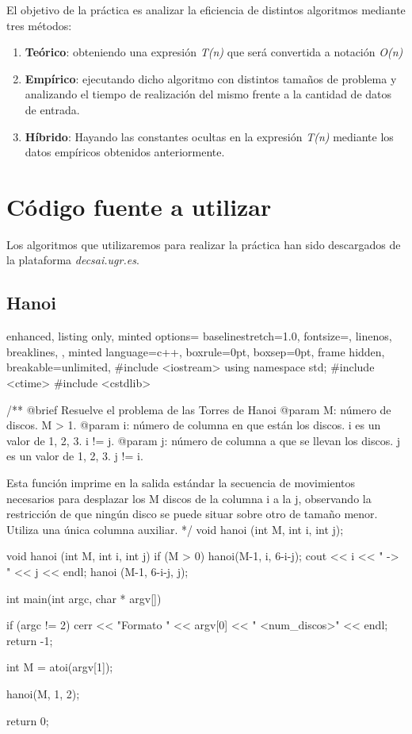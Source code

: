 \documentclass[12pt,spanish]{article}
\begin{document}
El objetivo de la práctica es analizar la eficiencia de distintos algoritmos mediante tres métodos:
\begin{enumerate}
\item \textbf{Teórico}: obteniendo una expresión \textit{T(n)} que será convertida a notación \textit{O(n)}
\item \textbf{Empírico}: ejecutando dicho algoritmo con distintos tamaños de problema y analizando el tiempo de realización del mismo frente a la cantidad de datos de entrada.
\item \textbf{Híbrido}: Hayando las constantes ocultas en la expresión \textit{T(n)} mediante los datos empíricos obtenidos anteriormente.
\end{enumerate}
\section{Código fuente a utilizar}

Los algoritmos que utilizaremos para realizar la práctica han sido descargados de la plataforma \textit{decsai.ugr.es}.

\subsection{Hanoi}
\begin{multicols}{2}
\begin{tcblisting}{
  enhanced,
  listing only,
  minted options={
    baselinestretch=1.0,
    fontsize=\footnotesize,
    linenos,
    breaklines,
  },
  minted language=c++,
  boxrule=0pt,
  boxsep=0pt,
  frame hidden,
  breakable=unlimited,
}  
#include <iostream>
using namespace std;
#include <ctime>
#include <cstdlib>

/**
   @brief Resuelve el problema de las Torres de Hanoi
   @param M: número de discos. M > 1.
   @param i: número de columna en que están los discos.
             i es un valor de {1, 2, 3}. i != j.
   @param j: número de columna a que se llevan los discos.
             j es un valor de {1, 2, 3}. j != i.

   Esta función imprime en la salida estándar la secuencia de 
   movimientos necesarios para desplazar los M discos de la
   columna i a la j, observando la restricción de que ningún
   disco se puede situar sobre otro de tamaño menor. Utiliza
   una única columna auxiliar.
*/
void hanoi (int M, int i, int j);

void hanoi (int M, int i, int j)
{
  if (M > 0)
    {
      hanoi(M-1, i, 6-i-j);
      cout << i << " -> " << j << endl;
      hanoi (M-1, 6-i-j, j);
  }
}

int main(int argc, char * argv[])
{
  
    if (argc != 2)
    {
      cerr << "Formato " << argv[0] << " <num_discos>" << endl;
      return -1;
    }

  int M = atoi(argv[1]);

  hanoi(M, 1, 2);

  return 0;
}
\end{tcblisting}
\end{multicols}
\newpage
\end{document}
